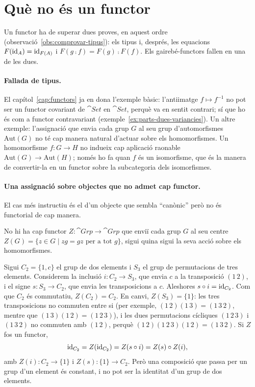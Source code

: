 \section{Què no és un functor}
\label{sec:no-functor}

Un functor ha de superar dues proves, en aquest ordre (observació~\ref{obs:comprovar-tipus}): els tipus i, després, les equacions $F(\operatorname{id}_A)=\operatorname{id}_{F(A)}$ i $F(g\comp f)=F(g)\comp F(f)$. Els gairebé-functors fallen en una de les dues.

\paragraph{Fallada de tipus.} El capítol~\ref{cap:functors} ja en dona l'exemple bàsic: l'antiimatge $f\mapsto f^{-1}$ no pot ser un functor covariant de $\cat{Set}$ en $\cat{Set}$, perquè va en sentit contrari; sí que ho és com a functor contravariant (exemple~\ref{ex:parts-dues-variancies}). Un altre exemple: l'assignació que envia cada grup $G$ al seu grup d'automorfismes $\mathrm{Aut}(G)$ no té cap manera natural d'actuar sobre els homomorfismes. Un homomorfisme $f\colon G\to H$ no indueix cap aplicació raonable $\mathrm{Aut}(G)\to\mathrm{Aut}(H)$; només ho fa quan $f$ és un isomorfisme, que és la manera de convertir-la en un functor sobre la subcategoria dels isomorfismes.

\paragraph{Una assignació sobre objectes que no admet cap functor.} El cas més instructiu és el d'un objecte que sembla \enquote{canònic} però no és functorial de cap manera.

\begin{proposicio}\label{prop:centre-no-functor}
No hi ha cap functor $Z\colon\cat{Grp}\to\cat{Grp}$ que enviï cada grup $G$ al seu centre $Z(G)=\{z\in G\mid zg=gz \text{ per a tot } g\}$, sigui quina sigui la seva acció sobre els homomorfismes.
\end{proposicio}

\begin{prova}
Sigui $C_2=\{1,c\}$ el grup de dos elements i $S_3$ el grup de permutacions de tres elements. Considerem la inclusió $i\colon C_2\to S_3$, que envia $c$ a la transposició $(1\,2)$, i el signe $s\colon S_3\to C_2$, que envia les transposicions a $c$. Aleshores $s\circ i=\operatorname{id}_{C_2}$. Com que $C_2$ és commutatiu, $Z(C_2)=C_2$. En canvi, $Z(S_3)=\{1\}$: les tres transposicions no commuten entre si (per exemple, $(1\,2)(1\,3)=(1\,3\,2)$, mentre que $(1\,3)(1\,2)=(1\,2\,3)$), i les dues permutacions cícliques $(1\,2\,3)$ i $(1\,3\,2)$ no commuten amb $(1\,2)$, perquè $(1\,2)(1\,2\,3)(1\,2)=(1\,3\,2)$. Si $Z$ fos un functor,
\[
\operatorname{id}_{C_2}=Z(\operatorname{id}_{C_2})=Z(s\circ i)=Z(s)\circ Z(i),
\]
amb $Z(i)\colon C_2\to\{1\}$ i $Z(s)\colon\{1\}\to C_2$. Però una composició que passa per un grup d'un element és constant, i no pot ser la identitat d'un grup de dos elements.
\end{prova}

